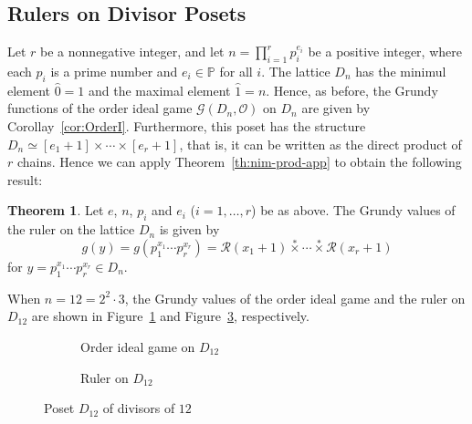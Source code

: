 \documentclass[a4paper,11pt]{amsart}
\theoremstyle{definition}
\newtheorem{thm}{Theorem}[section]
\newcommand{\nimmul}{\overset{*}{\times}}
\numberwithin{equation}{section}
\def\Pos{\mathbb{P}}
\def\Pgame{\mathscr{G}}
\def\OI{\mathscr{O}}
\def\fnh#1{\mathscr{R}\left({#1}\right)}
\begin{document}
\subsection{Rulers on Divisor Posets}\label{sc:Divisor}
%
Let $r$ be a nonnegative integer,
and let $n=\prod_{i=1}^{r}p_{i}^{e_{i}}$ be a positive integer, where each $p_{i}$ is a prime number and $e_{i}\in\Pos$ for all $i$.
The lattice $D_n$ has the minimul element $\hat0=1$ and the maximal element $\hat1=n$.
Hence, as before,
the Grundy functions of the order ideal game $\Pgame\left(D_{n},\OI\right)$ on $D_{n}$ 
are given by Corollay~\ref{cor:OrderI}.
%
Furthermore, this poset has the structure $D_n\simeq [e_{1}+1]\times\cdots\times[e_{r}+1]$,
that is, it can be written as the direct product of $r$ chains.
%
Hence we can apply Theorem~\ref{th:nim-prod-app} to obtain the following result:
%
\begin{thm}\label{th:Grundy-Dn-ruler}
Let $e$, $n$, $p_i$ and $e_i$ ($i=1,\dots,r$) be as above.
The Grundy values of the ruler on the lattice $D_n$ is given by
\begin{equation}
g(y)=g(p_{1}^{x_{1}}\cdots p_{r}^{x_{r}})
=\fnh{x_{1}+1}\nimmul\cdots\nimmul \fnh{x_{r}+1}
\end{equation}
for $y=p_{1}^{x_{1}}\cdots p_{r}^{x_{r}}\in D_{n}$.
\end{thm}
%
When $n=12=2^2\cdot3$, the Grundy values of 
the order ideal game and the ruler on $D_{12}$ are shown in
 Figure~\ref{fig:D12-OI} and Figure~\ref{fig:D12-ru}, respectively.
 
%
\begin{figure}[htbp]
{\scriptsize
\begin{subfigure}[b]{0.4\textwidth}
    \centering
{}
    \caption{Order ideal game on $D_{12}$}
    \label{fig:D12-OI}
\end{subfigure}
}
\hfill
{\scriptsize
\begin{subfigure}[b]{0.4\textwidth}
    \centering
{}
    \caption{Ruler on $D_{12}$}
    \label{fig:D12-ru}
\end{subfigure}
}
    \caption{Poset $D_{12}$ of divisors of $12$}
\end{figure}
%
%
%
\end{document}
